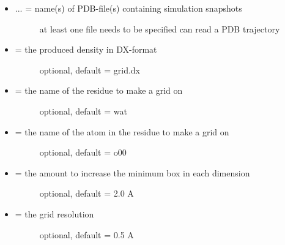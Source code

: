 \documentclass[letterpaper,10pt,english]{manual}
\begin{document}
\begin{itemize}
\item {} \begin{description}
\item[{ ... = name(s) of PDB-file(s) containing simulation snapshots}] \leavevmode
at least one file needs to be specified
can read a PDB trajectory

\end{description}

\item {} \begin{description}
\item[{ = the produced density in DX-format}] \leavevmode
optional, default = grid.dx

\end{description}

\item {} \begin{description}
\item[{ = the name of the residue to make a grid on}] \leavevmode
optional, default = wat

\end{description}

\item {} \begin{description}
\item[{ = the name of the atom in the residue to make a grid on}] \leavevmode
optional, default = o00

\end{description}

\item {} \begin{description}
\item[{ = the amount to increase the minimum box in each dimension}] \leavevmode
optional, default = 2.0 A

\end{description}

\item {} \begin{description}
\item[{ = the grid resolution}] \leavevmode
optional, default = 0.5 A


\end{description}
\end{itemize}
\end{document}
